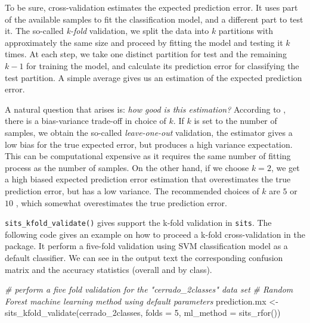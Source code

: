 \documentclass[a4paper,]{tufte-book}
\newenvironment{Shaded}{}{}
\newcommand{\AttributeTok}[1]{\textcolor[rgb]{0.49,0.56,0.16}{#1}}
\newcommand{\CommentTok}[1]{\textcolor[rgb]{0.38,0.63,0.69}{\textit{#1}}}
\newcommand{\DecValTok}[1]{\textcolor[rgb]{0.25,0.63,0.44}{#1}}
\newcommand{\FunctionTok}[1]{\textcolor[rgb]{0.02,0.16,0.49}{#1}}
\newcommand{\NormalTok}[1]{#1}
\newcommand{\OtherTok}[1]{\textcolor[rgb]{0.00,0.44,0.13}{#1}}
\begin{document}
To be sure, cross-validation estimates the expected prediction error. It uses part of the available samples to fit the classification model, and a different part to test it. The so-called \emph{k-fold} validation, we split the data into \(k\) partitions with approximately the same size and proceed by fitting the model and testing it \(k\) times. At each step, we take one distinct partition for test and the remaining \({k-1}\) for training the model, and calculate its prediction error for classifying the test partition. A simple average gives us an estimation of the expected prediction error.

A natural question that arises is: \emph{how good is this estimation?} According to \citet{Hastie2009}, there is a bias-variance trade-off in choice of \(k\). If \(k\) is set to the number of samples, we obtain the so-called \emph{leave-one-out} validation, the estimator gives a low bias for the true expected error, but produces a high variance expectation. This can be computational expensive as it requires the same number of fitting process as the number of samples. On the other hand, if we choose \({k=2}\), we get a high biased expected prediction error estimation that overestimates the true prediction error, but has a low variance. The recommended choices of \(k\) are \(5\) or \(10\) \citep{Hastie2009}, which somewhat overestimates the true prediction error.

\texttt{sits\_kfold\_validate()} gives support the k-fold validation in \texttt{sits}. The following code gives an example on how to proceed a k-fold cross-validation in the package. It perform a five-fold validation using SVM classification model as a default classifier. We can see in the output text the corresponding confusion matrix and the accuracy statistics (overall and by class).

\begin{Shaded}
\begin{Highlighting}[]
\CommentTok{\# perform a five fold validation for the "cerrado\_2classes" data set}
\CommentTok{\# Random Forest machine learning method using default parameters}
\NormalTok{prediction.mx }\OtherTok{\textless{}{-}} \FunctionTok{sits\_kfold\_validate}\NormalTok{(cerrado\_2classes, }
                                     \AttributeTok{folds =} \DecValTok{5}\NormalTok{, }
                                     \AttributeTok{ml\_method =} \FunctionTok{sits\_rfor}\NormalTok{())}
\end{Highlighting}
\end{Shaded}
\end{document}
